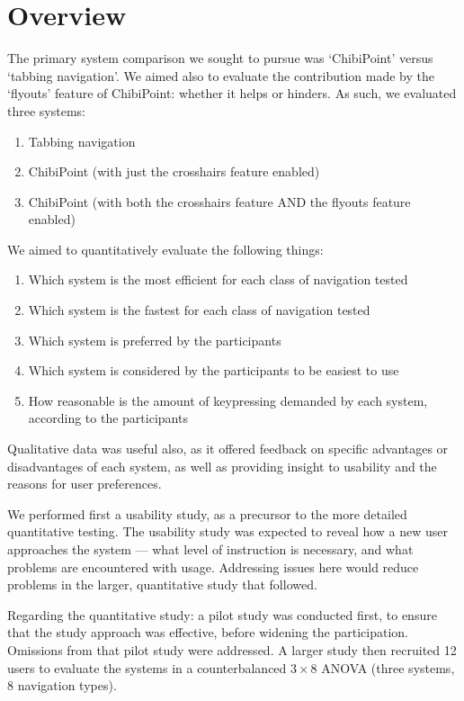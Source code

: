 \documentclass[a4paper, 12pt]{report}
\begin{document}
\section{Overview}
The primary system comparison we sought to pursue was `ChibiPoint' versus `tabbing navigation'. We aimed also to evaluate the contribution made by the `flyouts' feature of ChibiPoint: whether it helps or hinders. As such, we evaluated three systems:
\begin{enumerate}
\item Tabbing navigation
\item ChibiPoint (with just the crosshairs feature enabled)
\item ChibiPoint (with both the crosshairs feature AND the flyouts feature enabled)
\end{enumerate}

We aimed to quantitatively evaluate the following things:
\begin{enumerate}
\item Which system is the most efficient for each class of navigation tested
\item Which system is the fastest for each class of navigation tested
\item Which system is preferred by the participants
\item Which system is considered by the participants to be easiest to use
\item How reasonable is the amount of keypressing demanded by each system, according to the participants
\end{enumerate}

Qualitative data was useful also, as it offered feedback on specific advantages or disadvantages of each system, as well as providing insight to usability and the reasons for user preferences.

We performed first a usability study, as a precursor to the more detailed quantitative testing. The usability study was expected to reveal how a new user approaches the system --- what level of instruction is necessary, and what problems are encountered with usage. Addressing issues here would reduce problems in the larger, quantitative study that followed.

Regarding the quantitative study: a pilot study was conducted first, to ensure that the study approach was effective, before widening the participation. Omissions from that pilot study were addressed.
A larger study then recruited 12 users to evaluate the systems in a counterbalanced $3 \times 8$ ANOVA (three systems, 8 navigation types).
\end{document}
